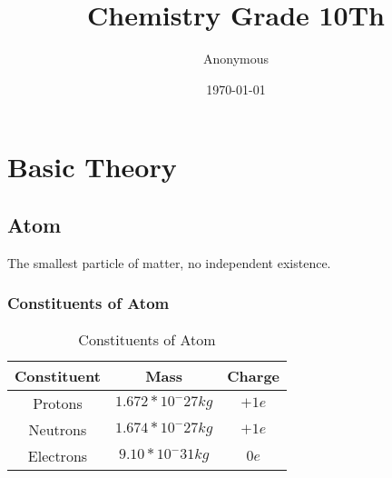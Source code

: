 \documentclass[a4paper]{article}
\begin{document}
	\title{Chemistry Grade 10Th}
	\author{Anonymous}
	\date{\today}
	\maketitle

	\section{Basic Theory}
	\subsection{Atom}
	The smallest particle of matter, no independent existence.
	\subsubsection{Constituents of Atom}
	\begin{table}[htpb]
		\centering
		\caption{Constituents of Atom}
		\label{tab:label}
		\begin{tabular}{ |c|c|c| }
			\hline
			Constituent & Mass & Charge \\
			\hline
			Protons & $1.672 * 10^-27 kg$ & $+1e$ \\
			\hline
			Neutrons & $1.674 * 10^-27 kg$ & $+1e$ \\
			\hline
			Electrons & $9.10 * 10^-31 kg$ & $0e$ \\
			\hline
		\end{tabular}
	\end{table}
\end{document}
